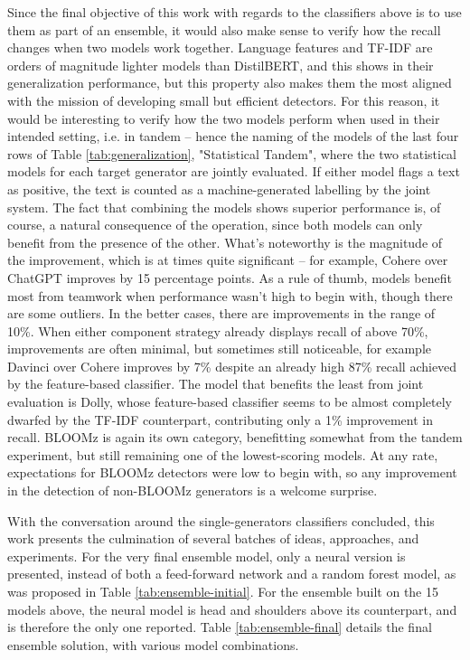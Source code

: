 Since the final objective of this work with regards to the classifiers above is to use them as part of an ensemble, it would also make sense to verify how the recall changes when two models work together.
Language features and TF-IDF are orders of magnitude lighter models than DistilBERT, and this shows in their generalization performance, but this property also makes them the most aligned with the mission of developing small but efficient detectors.
For this reason, it would be interesting to verify how the two models perform when used in their intended setting, i.e. in tandem -- hence the naming of the models of the last four rows of Table \ref{tab:generalization}, "Statistical Tandem", where the two statistical models for each target generator are jointly evaluated.
If either model flags a text as positive, the text is counted as a machine-generated labelling by the joint system.
The fact that combining the models shows superior performance is, of course, a natural consequence of the operation, since both models can only benefit from the presence of the other.
What's noteworthy is the magnitude of the improvement, which is at times quite significant -- for example, Cohere over ChatGPT improves by 15 percentage points.
As a rule of thumb, models benefit most from teamwork when performance wasn't high to begin with, though there are some outliers.
In the better cases, there are improvements in the range of 10\%.
When either component strategy already displays recall of above 70\%, improvements are often minimal, but sometimes still noticeable, for example Davinci over Cohere improves by 7\% despite an already high 87\% recall achieved by the feature-based classifier.
The model that benefits the least from joint evaluation is Dolly, whose feature-based classifier seems to be almost completely dwarfed by the TF-IDF counterpart, contributing only a 1\% improvement in recall.
BLOOMz is again its own category, benefitting somewhat from the tandem experiment, but still remaining one of the lowest-scoring models.
At any rate, expectations for BLOOMz detectors were low to begin with, so any improvement in the detection of non-BLOOMz generators is a welcome surprise.

With the conversation around the single-generators classifiers concluded, this work presents the culmination of several batches of ideas, approaches, and experiments.
For the very final ensemble model, only a neural version is presented, instead of both a feed-forward network and a random forest model, as was proposed in Table \ref{tab:ensemble-initial}.
For the ensemble built on the 15 models above, the neural model is head and shoulders above its counterpart, and is therefore the only one reported.
Table \ref{tab:ensemble-final} details the final ensemble solution, with various model combinations.

